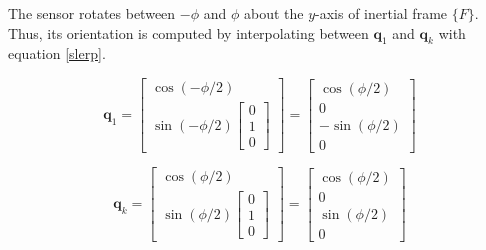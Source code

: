 The sensor rotates between $-\phi$ and $\phi$ about the $y$-axis of inertial frame $\{F\}$. Thus, its orientation is computed by interpolating between $\mathbf{q}_1$ and $\mathbf{q}_k$ with equation \ref{slerp}.
	
\begin{equation}
	\mathbf{q}_1 = \begin{bmatrix}
				 	\cos(-\phi/2) \\
				 	\sin(-\phi/2){\begin{bmatrix}
								 	0 \\ 1 \\ 0
							   	 \end{bmatrix}}
				 \end{bmatrix}
				 = \begin{bmatrix}
		 		   		\cos(\phi/2) \\ 0 \\ -\sin(\phi/2) \\ 0
				   \end{bmatrix}
\end{equation}

\begin{equation}
	\mathbf{q}_k = \begin{bmatrix}
				 	\cos(\phi/2) \\
				 	\sin(\phi/2){\begin{bmatrix}
								 	0 \\ 1 \\ 0
							   	 \end{bmatrix}}
				 \end{bmatrix}
				 = \begin{bmatrix}
		 		   		\cos(\phi/2) \\ 0 \\ \sin(\phi/2) \\ 0
				   \end{bmatrix}
\end{equation}

